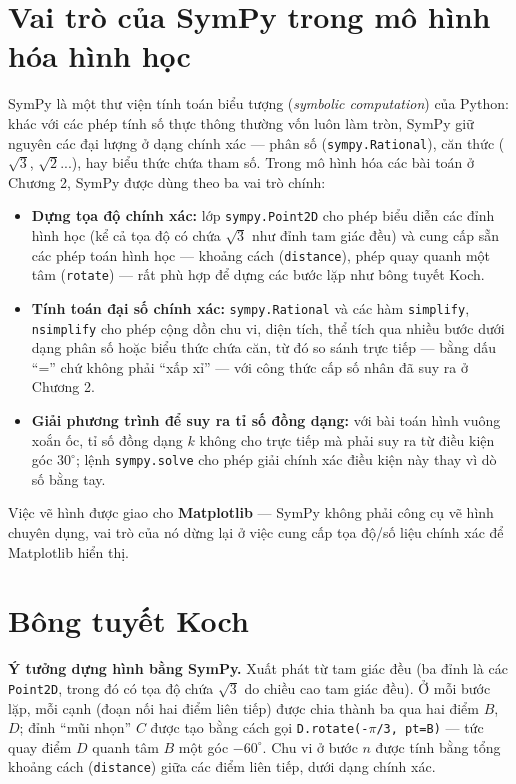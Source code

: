 \documentclass[12pt,a4paper,oneside]{book}
\theoremstyle{theorem}
\theoremstyle{definition}
\begin{document}
\section{Vai trò của SymPy trong mô hình hóa hình học}

SymPy là một thư viện tính toán biểu tượng (\textit{symbolic computation}) của Python: khác với các phép tính số thực thông thường vốn luôn làm tròn, SymPy giữ nguyên các đại lượng ở dạng chính xác — phân số (\texttt{sympy.Rational}), căn thức ($\sqrt{3}$, $\sqrt{2}$...), hay biểu thức chứa tham số. Trong mô hình hóa các bài toán ở Chương 2, SymPy được dùng theo ba vai trò chính:

\begin{itemize}[leftmargin=1.5em, itemsep=3pt]
  \item \textbf{Dựng tọa độ chính xác:} lớp \texttt{sympy.Point2D} cho phép biểu diễn các đỉnh hình học (kể cả tọa độ có chứa $\sqrt{3}$ như đỉnh tam giác đều) và cung cấp sẵn các phép toán hình học — khoảng cách (\texttt{distance}), phép quay quanh một tâm (\texttt{rotate}) — rất phù hợp để dựng các bước lặp như bông tuyết Koch.
  \item \textbf{Tính toán đại số chính xác:} \texttt{sympy.Rational} và các hàm \texttt{simplify}, \texttt{nsimplify} cho phép cộng dồn chu vi, diện tích, thể tích qua nhiều bước dưới dạng phân số hoặc biểu thức chứa căn, từ đó so sánh trực tiếp — bằng dấu ``='' chứ không phải ``xấp xỉ'' — với công thức cấp số nhân đã suy ra ở Chương 2.
  \item \textbf{Giải phương trình để suy ra tỉ số đồng dạng:} với bài toán hình vuông xoắn ốc, tỉ số đồng dạng $k$ không cho trực tiếp mà phải suy ra từ điều kiện góc $30^\circ$; lệnh \texttt{sympy.solve} cho phép giải chính xác điều kiện này thay vì dò số bằng tay.
\end{itemize}

Việc vẽ hình được giao cho \textbf{Matplotlib} — SymPy không phải công cụ vẽ hình chuyên dụng, vai trò của nó dừng lại ở việc cung cấp tọa độ/số liệu chính xác để Matplotlib hiển thị.

\section{Bông tuyết Koch}

\textbf{Ý tưởng dựng hình bằng SymPy.} Xuất phát từ tam giác đều (ba đỉnh là các \texttt{Point2D}, trong đó có tọa độ chứa $\sqrt{3}$ do chiều cao tam giác đều). Ở mỗi bước lặp, mỗi cạnh (đoạn nối hai điểm liên tiếp) được chia thành ba qua hai điểm $B$, $D$; đỉnh ``mũi nhọn'' $C$ được tạo bằng cách gọi \texttt{D.rotate(-$\pi$/3, pt=B)} — tức quay điểm $D$ quanh tâm $B$ một góc $-60^\circ$. Chu vi ở bước $n$ được tính bằng tổng khoảng cách (\texttt{distance}) giữa các điểm liên tiếp, dưới dạng chính xác.
\end{document}
